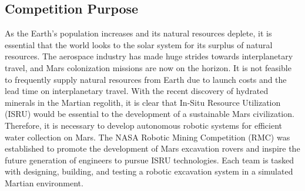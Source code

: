 \documentclass[class=article, crop=false]{standalone}
\begin{document}
	\subsection{Competition Purpose}
	\label{subsec:competition_purpose}
	
	
As the Earth's population increases and its natural resources deplete, it is essential that the world looks to the solar system for its surplus of natural resources. The aerospace industry has made huge strides towards interplanetary travel, and Mars colonization missions are now on the horizon. It is not feasible to frequently supply natural resources from Earth due to launch costs and the lead time on interplanetary travel. With the recent discovery of hydrated minerals in the Martian regolith, it is clear that In-Situ Resource Utilization (ISRU) would be essential to the development of a sustainable Mars civilization. Therefore, it is necessary to develop autonomous robotic systems for efficient water collection on Mars. The NASA Robotic Mining Competition (RMC) was established to promote the development of Mars excavation rovers and inspire the future generation of engineers to pursue ISRU technologies. Each team is tasked with designing, building, and testing a robotic excavation system in a simulated Martian environment. 
	
	
\end{document}
